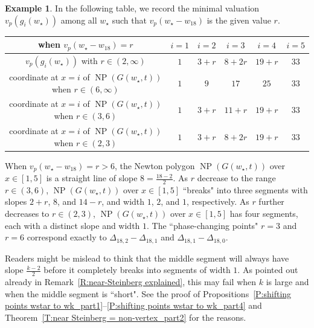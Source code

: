 \documentclass[12pt]{amsart}
\theoremstyle{definition}
\newtheorem{example}[subsection]{Example}
\numberwithin{equation}{subsection}
\DeclareMathOperator{\NP}{NP}
\begin{document}
\begin{example}
In the following table, we record the minimal valuation $v_p(g_i(w_\star))$ among all $w_\star$ such that $v_p(w_\star -w_{18})$ is the given value $r$.\begin{center}\renewcommand{\arraystretch}{1.2}\begin{tabular}{|c|c|c|c|c|c|}
\hline
when $v_p(w_\star -w_{18}) =r$ & $i=1$ & $i=2$ & $i=3$ & $i=4$ & $i=5$\\
\hline
$v_p(g_i(w_\star))$ with $r \in (2,\infty)$ & $1$ & $3+r$ & $8+2r$ & $19+r$ & $33$
\\ \hline
coordinate at $x=i$ of
$\NP(G(w_\star, t))$ when $r\in(6,\infty)$ & $1$ & $9$ & $17$ & $25$ & $33$
\\ \hline  
coordinate at $x=i$ of
$\NP(G(w_\star, t))$ when $r\in(3,6)$ & $1$ & $3+r$ & $11+r$ & $19+r$ & $33$
\\ \hline  
coordinate at $x=i$ of
$\NP(G(w_\star, t))$ when $r\in(2,3)$ & $1$ & $3+r$ & $8+2r$ & $19+r$ & $33$
\\
\hline
\end{tabular}
\end{center}
When $v_p(w_\star -w_{18}) = r > 6$, the Newton polygon  $\NP(G(w_\star, t))$ over $x \in[1,5]$ is a straight line of slope $8 = \frac{18-2}2$.  As $r$ decrease to the range $r \in (3,6)$, $\NP(G(w_\star, t))$ over $x \in[1,5]$ ``breaks" into three segments with slopes $2+r$, $8$, and $14-r$, and width $1$, $2$, and $1$, respectively. As $r$ further decreases to $r \in (2,3)$, $\NP(G(w_\star, t))$ over $x \in[1,5]$ has four segments, each with a distinct slope and width $1$.
The ``phase-changing points" $r =3$ and $r=6$ correspond exactly to $\Delta_{18, 2}-\Delta_{18,1}$ and $\Delta_{18,1} -\Delta_{18,0}$.

Readers might be mislead to think that the middle segment will always have slope $\frac{k-2}2$ before it completely breaks into segments of width $1$. As pointed out already in Remark~\ref{R:near-Steinberg explained}, this may fail when $k$ is large and when the middle segment is ``short".  See the proof of Propositions~\ref{P:shifting points wstar to wk_part1}--\ref{P:shifting points wstar to wk_part4} and Theorem~\ref{T:near Steinberg = non-vertex_part2} for the reasons.
\end{example}
\end{document}
